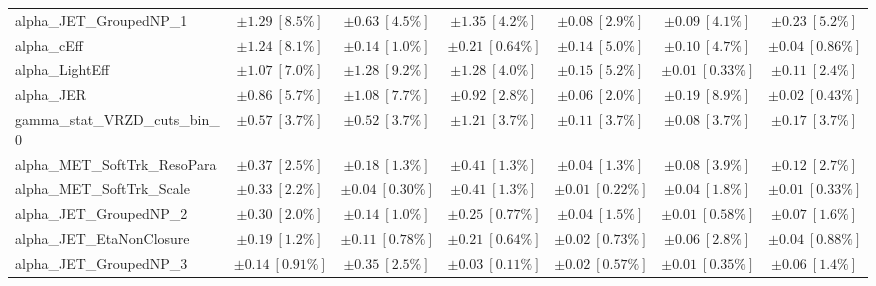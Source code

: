 \begin{sidewaystable}
\begin{center}
\begin{tabular*}{\textwidth}{@{\extracolsep{\fill}}lcccccc}
alpha\_JET\_GroupedNP\_1         & $\pm 1.29\ [8.5\%] $          & $\pm 0.63\ [4.5\%] $          & $\pm 1.35\ [4.2\%] $          & $\pm 0.08\ [2.9\%] $          & $\pm 0.09\ [4.1\%] $          & $\pm 0.23\ [5.2\%] $       \\
alpha\_cEff         & $\pm 1.24\ [8.1\%] $          & $\pm 0.14\ [1.0\%] $          & $\pm 0.21\ [0.64\%] $          & $\pm 0.14\ [5.0\%] $          & $\pm 0.10\ [4.7\%] $          & $\pm 0.04\ [0.86\%] $       \\
alpha\_LightEff         & $\pm 1.07\ [7.0\%] $          & $\pm 1.28\ [9.2\%] $          & $\pm 1.28\ [4.0\%] $          & $\pm 0.15\ [5.2\%] $          & $\pm 0.01\ [0.33\%] $          & $\pm 0.11\ [2.4\%] $       \\
alpha\_JER         & $\pm 0.86\ [5.7\%] $          & $\pm 1.08\ [7.7\%] $          & $\pm 0.92\ [2.8\%] $          & $\pm 0.06\ [2.0\%] $          & $\pm 0.19\ [8.9\%] $          & $\pm 0.02\ [0.43\%] $       \\
gamma\_stat\_VRZD\_cuts\_bin\_0         & $\pm 0.57\ [3.7\%] $          & $\pm 0.52\ [3.7\%] $          & $\pm 1.21\ [3.7\%] $          & $\pm 0.11\ [3.7\%] $          & $\pm 0.08\ [3.7\%] $          & $\pm 0.17\ [3.7\%] $       \\
alpha\_MET\_SoftTrk\_ResoPara         & $\pm 0.37\ [2.5\%] $          & $\pm 0.18\ [1.3\%] $          & $\pm 0.41\ [1.3\%] $          & $\pm 0.04\ [1.3\%] $          & $\pm 0.08\ [3.9\%] $          & $\pm 0.12\ [2.7\%] $       \\
alpha\_MET\_SoftTrk\_Scale         & $\pm 0.33\ [2.2\%] $          & $\pm 0.04\ [0.30\%] $          & $\pm 0.41\ [1.3\%] $          & $\pm 0.01\ [0.22\%] $          & $\pm 0.04\ [1.8\%] $          & $\pm 0.01\ [0.33\%] $       \\
alpha\_JET\_GroupedNP\_2         & $\pm 0.30\ [2.0\%] $          & $\pm 0.14\ [1.0\%] $          & $\pm 0.25\ [0.77\%] $          & $\pm 0.04\ [1.5\%] $          & $\pm 0.01\ [0.58\%] $          & $\pm 0.07\ [1.6\%] $       \\
alpha\_JET\_EtaNonClosure         & $\pm 0.19\ [1.2\%] $          & $\pm 0.11\ [0.78\%] $          & $\pm 0.21\ [0.64\%] $          & $\pm 0.02\ [0.73\%] $          & $\pm 0.06\ [2.8\%] $          & $\pm 0.04\ [0.88\%] $       \\
alpha\_JET\_GroupedNP\_3         & $\pm 0.14\ [0.91\%] $          & $\pm 0.35\ [2.5\%] $          & $\pm 0.03\ [0.11\%] $          & $\pm 0.02\ [0.57\%] $          & $\pm 0.01\ [0.35\%] $          & $\pm 0.06\ [1.4\%] $       \\

\end{tabular*}
\end{center}
\end{sidewaystable}
